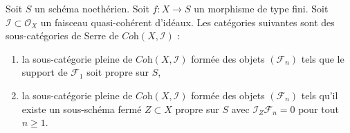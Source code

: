 \begin{lemma}
\label{lemma-systems-with-proper-support}
Soit $S$ un schéma noethérien. Soit $f : X \to S$ un morphisme de type fini.
Soit $\mathcal{I} \subset \mathcal{O}_X$ un
faisceau quasi-cohérent d'idéaux. Les catégories suivantes sont des sous-catégories de Serre
de $\textit{Coh}(X, \mathcal{I})$ :
\begin{enumerate}
\item la sous-catégorie pleine de $\textit{Coh}(X, \mathcal{I})$
formée des objets $(\mathcal{F}_n)$ tels que
le support de $\mathcal{F}_1$ soit propre sur $S$,
\item la sous-catégorie pleine de $\textit{Coh}(X, \mathcal{I})$
formée des objets $(\mathcal{F}_n)$ tels qu'il
existe un sous-schéma fermé $Z \subset X$ propre sur $S$
avec $\mathcal{I}_Z \mathcal{F}_n = 0$ pour tout $n \geq 1$.
\end{enumerate}
\end{lemma}

